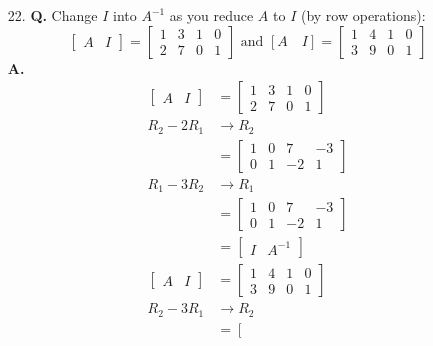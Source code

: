 \documentclass[main.tex]{subfiles}
\begin{document}
\begin{enumerate}
    \item [22.] \textbf{Q.} Change $I$ into $A^{-1}$ as you reduce $A$ to $I$ (by row operations):
    $$
    \left[\begin{array}{ll}
    A & I
    \end{array}\right]=\left[\begin{array}{llll}
    1 & 3 & 1 & 0 \\
    2 & 7 & 0 & 1
    \end{array}\right] \text { and }[A \quad I]=\left[\begin{array}{llll}
    1 & 4 & 1 & 0 \\
    3 & 9 & 0 & 1
    \end{array}\right]
    $$
    \textbf{A.}
    $$
    \begin{aligned}
    \left[\begin{array}{ll}
    A & I
    \end{array}\right] & =\left[\begin{array}{llll}
    1 & 3 & 1 & 0 \\
    2 & 7 & 0 & 1
    \end{array}\right] \\
    R_{2}-2 R_{1} & \rightarrow R_{2}\\
    & = \left[\begin{array}{cccc}
    1 & 0 & 7 & -3 \\
    0 & 1 & -2 & 1
    \end{array}\right]\\
    R_{1}-3 R_{2} & \rightarrow R_{1}\\
    & =\left[\begin{array}{cccc}
    1 & 0 & 7 & -3 \\
    0 & 1 & -2 & 1
    \end{array}\right] \\
    &=\left[\begin{array}{ll}
    I & A^{-1}
    \end{array}\right]\\
    \left[\begin{array}{ll}
    A & I
    \end{array}\right] &= \left[\begin{array}{llll}
    1 & 4 & 1 & 0 \\
    3 & 9 & 0 & 1
    \end{array}\right]\\
    R_{2} -3 R_{1} & \rightarrow R_{2}\\
    & = \left[\begin{array}{cccc}

\end{array}
\end{aligned}$$
\end{enumerate}
\end{document}
